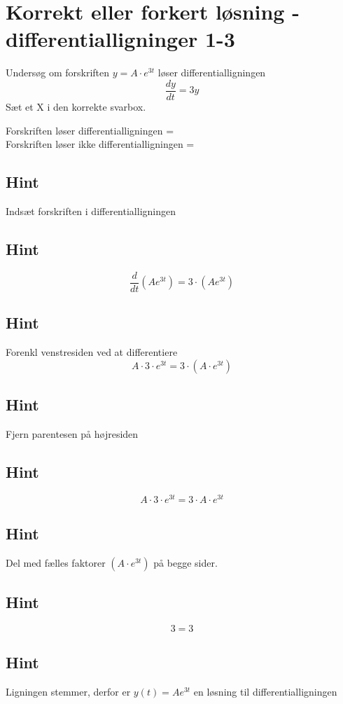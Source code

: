 \documentclass{article}
\newenvironment{exercise}[1]{\newpage\section{#1}}{}
\newcommand{\answerbox}[1]{\fbox{$#1$}}
\newcommand{\hint}{\subsection*{Hint}}
\begin{document}
\begin{exercise}{Korrekt eller forkert løsning - differentialligninger 1-3}
	
	
	Undersøg om forskriften $y = A \cdot e^{3t}$ løser differentialligningen
	\[
	\frac{dy}{dt} = 3y
	\]
	Sæt et X i den korrekte svarbox.
	
	Forskriften løser differentialligningen = \answerbox{X} \\
	
	Forskriften løser ikke differentialligningen = \answerbox{}
	
	\hint
	
	Indsæt forskriften i differentialligningen
	
	\hint
	\[
	\frac{d}{dt} \left( A e^{3t}\right) = 3 \cdot \left( A e^{3t} \right)
	\]
	
	
	\hint
	
	Forenkl venstresiden ved at differentiere
	\[
	A \cdot 3 \cdot e^{3t} = 3 \cdot \left(A \cdot e^{3t} \right)
	\]
	
	\hint
	
	Fjern parentesen på højresiden
	
	\hint
	\[
	A \cdot 3 \cdot e^{3t} = 3 \cdot A \cdot e^{3t}
	\]
	
	\hint
	Del med fælles faktorer $\left( A \cdot e^{3t} \right)$ på begge sider.
	
	\hint
	
	\[
	3 = 3
	\]
	
	
	\hint
	
	Ligningen stemmer, derfor er $y(t) = A e^{3t}$ en løsning til differentialligningen
	
\end{exercise}

\newpage
\end{document}
